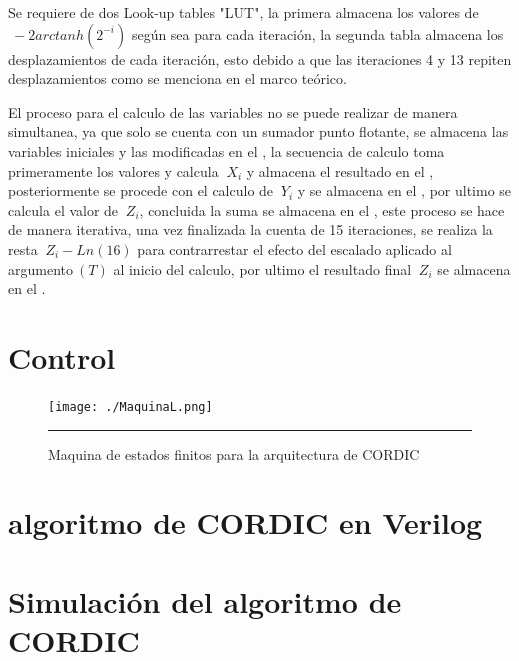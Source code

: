 Se requiere de dos Look-up tables "LUT", la primera almacena los valores de $\ -2arctanh \left( 2^{-i} \right) $ según sea para cada iteración,  la segunda tabla almacena los desplazamientos de cada iteración, esto debido a que las iteraciones 4 y 13 repiten desplazamientos como se menciona en el marco teórico. 

El proceso para el calculo de las variables no se puede realizar de manera simultanea, ya que solo se cuenta con un sumador punto flotante, se almacena las variables iniciales y las modificadas en el , la secuencia de calculo toma primeramente los valores y calcula $\ X_i $ y almacena el resultado en el , posteriormente se procede con el calculo de $\ Y_i $ y se almacena en el , por ultimo se calcula el valor de $\ Z_i $, concluida la suma se almacena en el , este proceso se hace de manera iterativa, una vez finalizada la cuenta de 15 iteraciones, se realiza la resta $\ Z_i - Ln\left(16\right) $ para contrarrestar el efecto del escalado aplicado al argumento$\ \left(T\right) $ al inicio del calculo, por ultimo el resultado final $\ Z_i $ se almacena en el .

\section{Control}

\begin{figure}[H]
  \centering
    \texttt{[image: ./MaquinaL.png]}
    \rule{35em}{0.5pt}
  \caption[Maquina de estados finitos para la arquitectura de CORDIC]{Maquina de estados finitos para la arquitectura de CORDIC   }
  \label{fig:FSML}
\end{figure}

\section{algoritmo de CORDIC en Verilog}


\section{Simulación del algoritmo de CORDIC}

